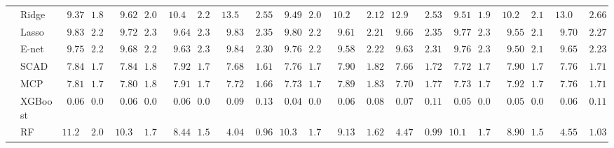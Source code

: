 \begin{tabular}{ll|ll|llllll|llllll|llllll}
 & Ridge  & $\phantom{0}9.37$ & $1.86$ & $\phantom{0}9.62$ & $2.02$ & $10.49$ & $2.24$ & $13.53$ & $\phantom{0}2.55$ & $\phantom{0}9.49$ & $2.02$ & $10.22$ & $\phantom{0}2.12$ & $12.99$ & $\phantom{0}2.53$ & $\phantom{0}9.51$ & $1.90$ & $10.24$ & $2.15$ & $13.02$ & $\phantom{0}2.66$ \\
 & Lasso  & $\phantom{0}9.83$ & $2.22$ & $\phantom{0}9.72$ & $2.35$ & $\phantom{0}9.64$ & $2.30$ & $\phantom{0}9.83$ & $\phantom{0}2.35$ & $\phantom{0}9.80$ & $2.28$ & $\phantom{0}9.61$ & $\phantom{0}2.21$ & $\phantom{0}9.66$ & $\phantom{0}2.35$ & $\phantom{0}9.77$ & $2.30$ & $\phantom{0}9.55$ & $2.18$ & $\phantom{0}9.70$ & $\phantom{0}2.27$ \\
 & E-net  & $\phantom{0}9.75$ & $2.22$ & $\phantom{0}9.68$ & $2.29$ & $\phantom{0}9.63$ & $2.31$ & $\phantom{0}9.84$ & $\phantom{0}2.30$ & $\phantom{0}9.76$ & $2.27$ & $\phantom{0}9.58$ & $\phantom{0}2.22$ & $\phantom{0}9.63$ & $\phantom{0}2.31$ & $\phantom{0}9.76$ & $2.30$ & $\phantom{0}9.50$ & $2.13$ & $\phantom{0}9.65$ & $\phantom{0}2.23$ \\
 & SCAD  & $\phantom{0}7.84$ & $1.77$ & $\phantom{0}7.84$ & $1.81$ & $\phantom{0}7.92$ & $1.77$ & $\phantom{0}7.68$ & $\phantom{0}1.61$ & $\phantom{0}7.76$ & $1.72$ & $\phantom{0}7.90$ & $\phantom{0}1.82$ & $\phantom{0}7.66$ & $\phantom{0}1.72$ & $\phantom{0}7.72$ & $1.79$ & $\phantom{0}7.90$ & $1.71$ & $\phantom{0}7.76$ & $\phantom{0}1.71$ \\
 & MCP  & $\phantom{0}7.81$ & $1.75$ & $\phantom{0}7.80$ & $1.82$ & $\phantom{0}7.91$ & $1.74$ & $\phantom{0}7.72$ & $\phantom{0}1.66$ & $\phantom{0}7.73$ & $1.73$ & $\phantom{0}7.89$ & $\phantom{0}1.83$ & $\phantom{0}7.70$ & $\phantom{0}1.77$ & $\phantom{0}7.73$ & $1.78$ & $\phantom{0}7.92$ & $1.73$ & $\phantom{0}7.76$ & $\phantom{0}1.71$ \\
 & XGBoost  & $\phantom{0}0.06$ & $0.08$ & $\phantom{0}0.06$ & $0.07$ & $\phantom{0}0.06$ & $0.08$ & $\phantom{0}0.09$ & $\phantom{0}0.13$ & $\phantom{0}0.04$ & $0.07$ & $\phantom{0}0.06$ & $\phantom{0}0.08$ & $\phantom{0}0.07$ & $\phantom{0}0.11$ & $\phantom{0}0.05$ & $0.08$ & $\phantom{0}0.05$ & $0.08$ & $\phantom{0}0.06$ & $\phantom{0}0.11$ \\
 & RF  & $11.21$ & $2.01$ & $10.31$ & $1.71$ & $\phantom{0}8.44$ & $1.59$ & $\phantom{0}4.04$ & $\phantom{0}0.96$ & $10.34$ & $1.71$ & $\phantom{0}9.13$ & $\phantom{0}1.62$ & $\phantom{0}4.47$ & $\phantom{0}0.99$ & $10.19$ & $1.78$ & $\phantom{0}8.90$ & $1.52$ & $\phantom{0}4.55$ & $\phantom{0}1.03$ \\

\end{tabular}

